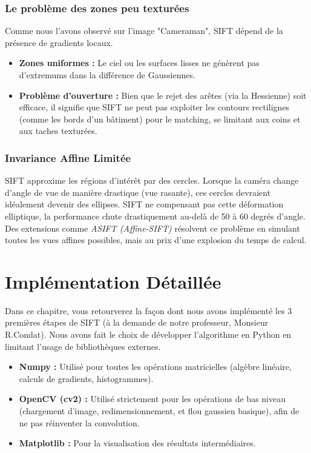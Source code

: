 \documentclass[a4paper,12pt]{report}
\begin{document}
\subsection{Le problème des zones peu texturées}
Comme nous l'avons observé sur l'image "Cameraman", SIFT dépend de la présence de gradients locaux.
\begin{itemize}
    \item \textbf{Zones uniformes :} Le ciel ou les surfaces lisses ne génèrent pas d'extremums dans la différence de Gaussiennes.
    \item \textbf{Problème d'ouverture :} Bien que le rejet des arêtes (via la Hessienne) soit efficace, il signifie que SIFT ne peut pas exploiter les contours rectilignes (comme les bords d'un bâtiment) pour le matching, se limitant aux coins et aux taches texturées.
\end{itemize}

\subsection{Invariance Affine Limitée}
SIFT approxime les régions d'intérêt par des cercles. Lorsque la caméra change d'angle de vue de manière drastique (vue rasante), ces cercles devraient idéalement devenir des ellipses. SIFT ne compensant pas cette déformation elliptique, la performance chute drastiquement au-delà de 50 à 60 degrés d'angle. Des extensions comme \textit{ASIFT (Affine-SIFT)} résolvent ce problème en simulant toutes les vues affines possibles, mais au prix d'une explosion du temps de calcul.

\chapter{Implémentation Détaillée}

Dans ce chapitre, vous retourverez la façon dont nous avons implémenté les 3 premières étapes de SIFT (à la demande de notre professeur, Monsieur R.Condat). Nous avons fait le choix de développer l'algorithme en Python en limitant l'usage de bibliothèques externes.
\begin{itemize}
    \item \textbf{Numpy :} Utilisé pour toutes les opérations matricielles (algèbre linéaire, calculs de gradients, histogrammes).
    \item \textbf{OpenCV (cv2) :} Utilisé strictement pour les opérations de bas niveau (chargement d'image, redimensionnement, et flou gaussien basique), afin de ne pas réinventer la convolution.
    \item \textbf{Matplotlib :} Pour la visualisation des résultats intermédiaires.
\end{itemize}
\end{document}
